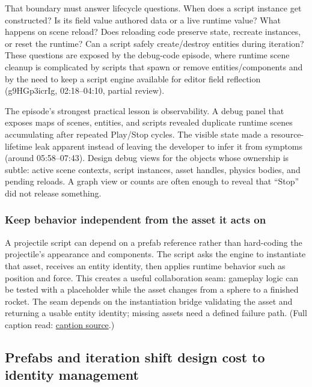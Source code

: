 That boundary must answer lifecycle questions. When does a script instance get constructed? Is its field value authored data or a live runtime value? What happens on scene reload? Does reloading code preserve state, recreate instances, or reset the runtime? Can a script safely create/destroy entities during iteration? These questions are exposed by the debug-code episode, where runtime scene cleanup is complicated by scripts that spawn or remove entities/components and by the need to keep a script engine available for editor field reflection (g9HGp3icrIg, 02:18--04:10, partial review).

The episode's strongest practical lesson is observability. A debug panel that exposes maps of scenes, entities, and scripts revealed duplicate runtime scenes accumulating after repeated Play/Stop cycles. The visible state made a resource-lifetime leak apparent instead of leaving the developer to infer it from symptoms (around 05:58--07:43). Design debug views for the objects whose ownership is subtle: active scene contexts, script instances, asset handles, physics bodies, and pending reloads. A graph view or counts are often enough to reveal that ``Stop'' did not release something.

\subsubsection{Keep behavior independent from the asset it acts on}\label{06-engine-ii-ch033-keep-behavior-independent-from-the-asset-it-acts-on}

A projectile script can depend on a prefab reference rather than hard-coding the projectile's appearance and components. The script asks the engine to instantiate that asset, receives an entity identity, then applies runtime behavior such as position and force. This creates a useful collaboration seam: gameplay logic can be tested with a placeholder while the asset changes from a sphere to a finished rocket. The seam depends on the instantiation bridge validating the asset and returning a usable entity identity; missing assets need a defined failure path. (Full caption read: \href{https://www.youtube.com/watch?v=ogQTYSokqAI}{caption source}.)

\subsection{Prefabs and iteration shift design cost to identity management}\label{06-engine-ii-ch033-prefabs-and-iteration-shift-design-cost-to-identity-management}

